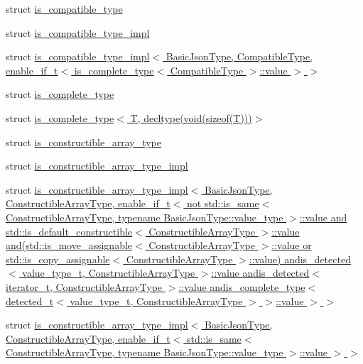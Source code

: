 \begin{DoxyCompactItemize}
struct \hyperlink{structnlohmann_1_1detail_1_1is__compatible__type}{is\+\_\+compatible\+\_\+type}
\item 
struct \hyperlink{structnlohmann_1_1detail_1_1is__compatible__type__impl}{is\+\_\+compatible\+\_\+type\+\_\+impl}
\item 
struct \hyperlink{structnlohmann_1_1detail_1_1is__compatible__type__impl_3_01_basic_json_type_00_01_compatible_typ632bee7ec037fc0233f1bbe9dd7d8874}{is\+\_\+compatible\+\_\+type\+\_\+impl$<$ Basic\+Json\+Type, Compatible\+Type, enable\+\_\+if\+\_\+t$<$ is\+\_\+complete\+\_\+type$<$ Compatible\+Type $>$\+::value $>$ $>$}
\item 
struct \hyperlink{structnlohmann_1_1detail_1_1is__complete__type}{is\+\_\+complete\+\_\+type}
\item 
struct \hyperlink{structnlohmann_1_1detail_1_1is__complete__type_3_01_t_00_01decltype_07void_07sizeof_07_t_08_08_08_4}{is\+\_\+complete\+\_\+type$<$ T, decltype(void(sizeof(\+T)))$>$}
\item 
struct \hyperlink{structnlohmann_1_1detail_1_1is__constructible__array__type}{is\+\_\+constructible\+\_\+array\+\_\+type}
\item 
struct \hyperlink{structnlohmann_1_1detail_1_1is__constructible__array__type__impl}{is\+\_\+constructible\+\_\+array\+\_\+type\+\_\+impl}
\item 
struct \hyperlink{structnlohmann_1_1detail_1_1is__constructible__array__type__impl_3_01_basic_json_type_00_01_cons437c79c936c626a4ffcf289ee9218c26}{is\+\_\+constructible\+\_\+array\+\_\+type\+\_\+impl$<$ Basic\+Json\+Type, Constructible\+Array\+Type, enable\+\_\+if\+\_\+t$<$ not std\+::is\+\_\+same$<$ Constructible\+Array\+Type, typename Basic\+Json\+Type\+::value\+\_\+type $>$\+::value and std\+::is\+\_\+default\+\_\+constructible$<$ Constructible\+Array\+Type $>$\+::value and(std\+::is\+\_\+move\+\_\+assignable$<$ Constructible\+Array\+Type $>$\+::value or std\+::is\+\_\+copy\+\_\+assignable$<$ Constructible\+Array\+Type $>$\+::value) andis\+\_\+detected$<$ value\+\_\+type\+\_\+t, Constructible\+Array\+Type $>$\+::value andis\+\_\+detected$<$ iterator\+\_\+t, Constructible\+Array\+Type $>$\+::value andis\+\_\+complete\+\_\+type$<$ detected\+\_\+t$<$ value\+\_\+type\+\_\+t, Constructible\+Array\+Type $>$ $>$\+::value $>$ $>$}
\item 
struct \hyperlink{structnlohmann_1_1detail_1_1is__constructible__array__type__impl_3_01_basic_json_type_00_01_cons8cf88e17d5eaa68665a8fb4b97604b0e}{is\+\_\+constructible\+\_\+array\+\_\+type\+\_\+impl$<$ Basic\+Json\+Type, Constructible\+Array\+Type, enable\+\_\+if\+\_\+t$<$ std\+::is\+\_\+same$<$ Constructible\+Array\+Type, typename Basic\+Json\+Type\+::value\+\_\+type $>$\+::value $>$ $>$}

\end{DoxyCompactItemize}
